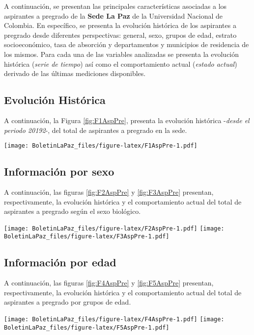 \documentclass[
]{book}
\begin{document}
A continuación, se presentan las principales características asociadas a los aspirantes a pregrado de la \textbf{Sede La Paz} de la Universidad Nacional de Colombia. En específico, se presenta la evolución histórica de los aspirantes a pregrado desde diferentes perspectivas: general, sexo, grupos de edad, estrato socioeconómico, tasa de absorción y departamentos y municipios de residencia de los mismos. Para cada una de las variables analizadas se presenta la evolución histórica (\emph{serie de tiempo}) así como el comportamiento actual (\emph{estado actual}) derivado de las últimas mediciones disponibles.

\hypertarget{evoluciuxf3n-histuxf3rica}{%
\subsection{Evolución Histórica}\label{evoluciuxf3n-histuxf3rica}}

A continuación, la Figura \ref{fig:F1AspPre}, presenta la evolución histórica -\emph{desde el periodo 20192}-, del total de aspirantes a pregrado en la sede.

\texttt{[image: BoletinLaPaz\_files/figure-latex/F1AspPre-1.pdf]}

\hypertarget{informaciuxf3n-por-sexo}{%
\subsection{Información por sexo}\label{informaciuxf3n-por-sexo}}

A continuación, las figuras \ref{fig:F2AspPre} y \ref{fig:F3AspPre} presentan, respectivamente, la evolución histórica y el comportamiento actual del total de aspirantes a pregrado según el sexo biológico.

\texttt{[image: BoletinLaPaz\_files/figure-latex/F2AspPre-1.pdf]}
\texttt{[image: BoletinLaPaz\_files/figure-latex/F3AspPre-1.pdf]}

\hypertarget{informaciuxf3n-por-edad}{%
\subsection{Información por edad}\label{informaciuxf3n-por-edad}}

A continuación, las figuras \ref{fig:F4AspPre} y \ref{fig:F5AspPre} presentan, respectivamente, la evolución histórica y el comportamiento actual del total de aspirantes a pregrado por grupos de edad.

\texttt{[image: BoletinLaPaz\_files/figure-latex/F4AspPre-1.pdf]}
\texttt{[image: BoletinLaPaz\_files/figure-latex/F5AspPre-1.pdf]}
\end{document}
